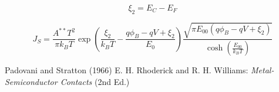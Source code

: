 \documentclass[11pt,uplatex,a4paper]{jsarticle}
\begin{document}
\begin{equation}
 \xi_2 = E_C - E_F
\end{equation}


\begin{equation}
 J_S = \frac{A^{**}T^2}{\pi k_B T}
  \exp\left( \frac{\xi_2}{k_B T} - \frac{q \phi_B - qV + \xi_2}{E_{0}}
			 \right)
    \frac{\sqrt{\pi E_{00}(q \phi_B - q V + \xi_2)}}
  {\cosh \left(\frac{E_{00}}{k_B T}\right)}
\end{equation}

\appendix

 \begin{thebibliography}{99}
   Padovani and Stratton (1966)
   E. H. Rhoderick and R. H. Williams:
		   \textit{Metal-Semiconductor Contacts} (2nd Ed.)
     
 \end{thebibliography}
\end{document}
